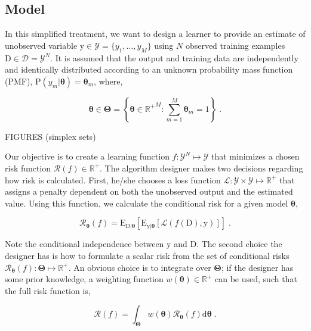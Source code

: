 \documentclass[12pt]{article}
\begin{document}
\subsection{Model}

In this simplified treatment, we want to design a learner to provide an estimate of unobserved variable $\mathrm{y} \in \mathcal{Y} = \{ y_1, \ldots, y_M \}$ using $N$ observed training examples $\mathrm{D} \in \mathcal{D} = \mathcal{Y}^N$. It is assumed that the output and training data are independently and identically distributed according to an unknown probability mass function (PMF), $\text{P}(y_m|\bm{\theta}) = \bm{\theta}_m$, where,

\begin{equation}
\bm{\theta} \in \bm{\Theta} = \left\{ \bm{\theta} \in {\mathbb{R}^+}^M: \sum_{m=1}^M \bm{\theta}_m = 1 \right\} \;. 
\end{equation}

FIGURES (simplex sets)

Our objective is to create a learning function $f: \mathcal{Y}^N \mapsto \mathcal{Y}$ that minimizes a chosen risk function $\mathcal{R}(f) \in \mathbb{R}^+$.  The algorithm designer makes two decisions regarding how risk is calculated. First, he/she chooses a loss function $\mathcal{L}: \mathcal{Y} \times \mathcal{Y} \mapsto \mathbb{R}^+$ that assigns a penalty dependent on both the unobserved output and the estimated value. Using this function, we calculate the conditional risk for a given model $\bm{\theta}$,

\begin{equation}
\mathcal{R}_{\bm{\theta}}(f) = \text{E}_{\mathrm{D}|\bm{\theta}} \left[ \text{E}_{\mathrm{y}|\bm{\theta}} \left[ \mathcal{L}(f(\mathrm{D}),\mathrm{y}) \right] \right] \;.
\end{equation}

Note the conditional independence between $\mathrm{y}$ and $\mathrm{D}$. The second choice the designer has is how to formulate a scalar risk from the set of conditional risks $\mathcal{R}_{\bm{\theta}}(f): \bm{\Theta} \mapsto \mathbb{R}^+$. An obvious choice is to integrate over $\bm{\Theta}$; if the designer has some prior knowledge, a weighting function $w(\bm{\theta}) \in \mathbb{R}^+$ can be used, such that the full risk function is,

\begin{equation}
\mathcal{R}(f) = \int_{\bm{\Theta}} w(\bm{\theta}) \mathcal{R}_{\bm{\theta}}(f)\mathrm{d}\bm{\theta} \;.
\end{equation}
\end{document}
